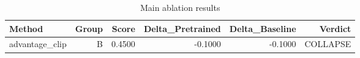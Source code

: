 \begin{table}[htbp]
\centering
\caption{Main ablation results}
\label{tab:main-results}
\begin{tabular}{lrrrrr}
\toprule
\textbf{Method} & \textbf{Group} & \textbf{Score} & \textbf{Delta\_Pretrained} & \textbf{Delta\_Baseline} & \textbf{Verdict} \\
\midrule
advantage\_clip & B & 0.4500 & -0.1000 & -0.1000 & COLLAPSE \\
\bottomrule
\end{tabular}
\end{table}